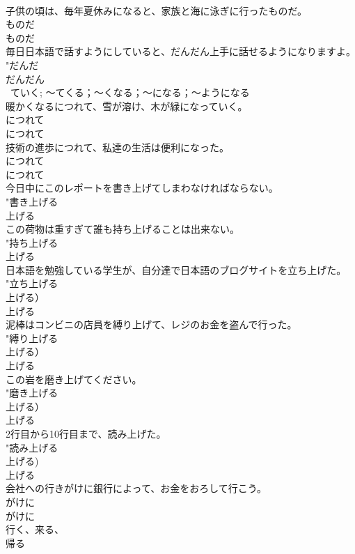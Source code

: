 \documentclass[8pt]{extreport}
\begin{document}
\begin{CJK}{UTF8}{min}
{{\\	子供の頃は、毎年夏休みになると、家族と海に泳ぎに行ったものだ。	
\\	ものだ 
\\	ものだ 
\\	毎日日本語で話すようにしていると、だんだん上手に話せるようになりますよ。	
\\	"だんだ
\\	だんだん 
\\	~ていく; 〜てくる；〜くなる；〜になる；〜ようになる
\\	暖かくなるにつれて、雪が溶け、木が緑になっていく。	
\\	につれて 
\\	につれて 
\\	技術の進歩につれて、私達の生活は便利になった。	
\\	につれて 
\\	につれて 
\\	今日中にこのレポートを書き上げてしまわなければならない。	
\\	"書き上げる 
\\	上げる 
\\	この荷物は重すぎて誰も持ち上げることは出来ない。	
\\	"持ち上げる 
\\	上げる 
\\	日本語を勉強している学生が、自分達で日本語のブログサイトを立ち上げた。	
\\	"立ち上げる 
\\	上げる） 
\\	上げる 
\\	泥棒はコンビニの店員を縛り上げて、レジのお金を盗んで行った。	
\\	"縛り上げる 
\\	上げる） 
\\	上げる 
\\	この岩を磨き上げてください。	
\\	"磨き上げる 
\\	上げる） 
\\	上げる 
\\	2行目から10行目まで、読み上げた。	
\\	"読み上げる 
\\	上げる) 
\\	上げる 
\\	会社への行きがけに銀行によって、お金をおろして行こう。	
\\	がけに 
\\	がけに 
\\	行く、来る、
\\	帰る 
}}
\end{CJK}
\end{document}
